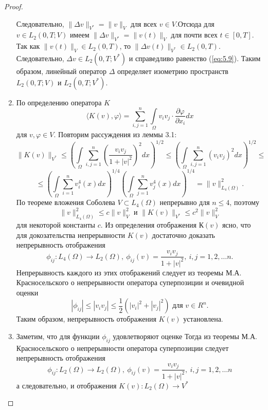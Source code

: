 \begin{proof}
\begin{enumerate}
        Следовательно, \linebreak $\| \Delta v \|_{V^\ast} = \| v \|_V$ для всех $v \in V$.Отсюда для $v \in L_2(0, T; V)$ имеем
        \linebreak $\| \Delta v \|_{V^\ast} = \| v(t) \|_V$ для почти всех $t \in [0, T]$.
        Так как $\| v(t) \|_V \in L_2(0, T)$,
        то $\| \Delta v(t)\|_{V^*} \in L_2(0, T)$. Следовательно, $\Delta v \in L_2(0, T; V^\ast)$ и справедливо
        равенство (\ref{eq:5.9}). Таким образом, линейный оператор $\Delta$ определяет изометрию пространств $L_2(0, T; V)$ и $L_2(0, T; V^\ast)$.
        \item По определению оператора $K$
        $$\langle K(v), \varphi \rangle = \sum_{i,j=1}^{n}\int\limits_\Omega v_iv_j \cdot \frac{\partial \varphi }{\partial x_i}dx$$
        для $v, \varphi \in V$. Повторим рассуждения из леммы 3.1:
        $$\| K(v) \|_{V^*} \le \left(\int\limits_\Omega \sum_{i, j=1}^n \left(\frac{v_i v_j}{1+|v|^2}\right)^2 dx \right)^{1/2}
        \le \left(\int\limits_\Omega \sum_{i, j=1}^n (v_i v_j)^2 dx \right)^{1/2} \le$$
        $$ \le \left(\int\limits_\Omega \sum_{i=1}^n v_i^4(x)dx \right)^{1/4} \left(\int\limits_\Omega \sum_{j=1}^n v_j^4(x)dx \right)^{1/4} =
        \| v \|^2_{L_4(\Omega)}.$$
        По теореме вложения Соболева $V \subset L_4(\Omega)$ непрерывно для $n \le 4$, поэтому
        $$\| v \|^2_{L_4(\Omega)} \le c \| v \|^2_V \textrm{ и } \| K(v) \|_{V^*}
        \le c^2 \| v \|^2_V$$ для некоторой константы $c$.
        Из определения отображения $К(v)$ ясно, что для докозательства непрерывности $K(v)$ достаточно доказать непрерывность отображения
        $$\phi_{ij}: L_4(\Omega) \rightarrow L_2(\Omega), \ \phi_{ij}(v) = \frac{v_i v_j}{1+|v|^2}, \ i,j = 1, 2, \dots n.$$
        Непрерывность каждого из этих отображений следует из теоремы М.А. Красносельского о непрерывности оператора суперпозиции и очевидной оценки
        $$|\phi_{ij}| \le |v_i v_j| \le \frac{1}{2}(|v_i|^2+|v_j|^2) \textrm{ для } v \in R^n.$$
        Таким образом, непрерывность отображения $K(v)$ установлена.
        \item Заметим, что для функции $\phi_{ij}$ удовлетворяют оценке
        Тогда из теоремы М.А. Красносельского о непрерывности оператора суперпозиции следует непрерывность отображения
        $$\phi_{ij}: L_2(\Omega) \rightarrow L_2(\Omega), \ \phi_{ij}(v) = \frac{v_i v_j}{1+|v|^2}, \ i,j = 1, 2, \dots n$$
        а следовательно, и отображения $K(v): L_2(\Omega) \rightarrow V^*$


\end{enumerate}
\end{proof}
